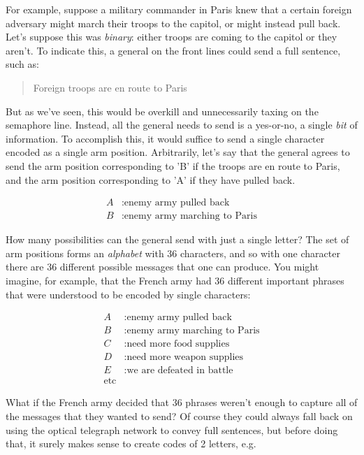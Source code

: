 \documentclass[UTF8]{book}
\begin{document}
\begin{CJK}{UTF8}{gbsn}
For example, suppose a military commander in Paris knew that a certain foreign adversary might march their troops to the capitol, or might instead pull back. Let's suppose this was \emph{binary}: either troops are coming to the capitol or they aren't. To indicate this, a general on the front lines could send a full sentence, such as:

\begin{quotation}
Foreign troops are en route to Paris
\end{quotation}

But as we've seen, this would be overkill and unnecessarily taxing on the semaphore line. Instead, all the general needs to send is a yes-or-no, a single \emph{bit} of information. To accomplish this, it would suffice to send a single character encoded as a single arm position. Arbitrarily, let's say that the general agrees to send the arm position corresponding to 'B' if the troops are en route to Paris, and the arm position corresponding to 'A' if they have pulled back.

\begin{align*}
	A&: \text{enemy army pulled back} \\
	B&: \text{enemy army marching to Paris}
\end{align*}

How many possibilities can the general send with just a single letter? The set of arm positions forms an \emph{alphabet} with 36 characters, and so with one character there are 36 different possible messages that one can produce. You might imagine, for example, that the French army had 36 different important phrases that were understood to be encoded by single characters:

\begin{align*}
	A&: \text{enemy army pulled back} \\
	B&: \text{enemy army marching to Paris} \\
	C&: \text{need more food supplies} \\
        D&: \text{need more weapon supplies} \\
        E&: \text{we are defeated in battle} \\
        \text{etc} &
\end{align*}

What if the French army decided that 36 phrases weren't enough to capture all of the messages that they wanted to send? Of course they could always fall back on using the optical telegraph network to convey full sentences, but before doing that, it surely makes sense to create codes of 2 letters, e.g.


\end{CJK}
\end{document}
